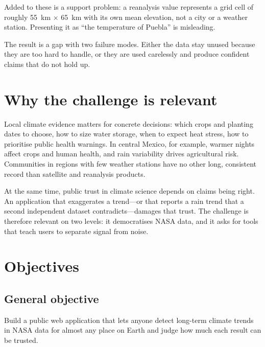 \documentclass[12pt, oneside, openany]{report}
\begin{document}
Added to these is a support problem: a reanalysis value represents a grid cell of roughly \SI{55}{\km} $\times$ \SI{65}{\km} with its own mean elevation, not a city or a weather station. Presenting it as \enquote{the temperature of Puebla} is misleading.

The result is a gap with two failure modes. Either the data stay unused because they are too hard to handle, or they are used carelessly and produce confident claims that do not hold up.

\section{Why the challenge is relevant}

Local climate evidence matters for concrete decisions: which crops and planting dates to choose, how to size water storage, when to expect heat stress, how to prioritise public health warnings. In central Mexico, for example, warmer nights affect crops and human health, and rain variability drives agricultural risk. Communities in regions with few weather stations have no other long, consistent record than satellite and reanalysis products.

At the same time, public trust in climate science depends on claims being right. An application that exaggerates a trend---or that reports a rain trend that a second independent dataset contradicts---damages that trust. The challenge is therefore relevant on two levels: it democratises NASA data, and it asks for tools that teach users to separate signal from noise.

\section{Objectives}

\subsection*{General objective}
Build a public web application that lets anyone detect long-term climate trends in NASA data for almost any place on Earth and judge how much each result can be trusted.
\end{document}
